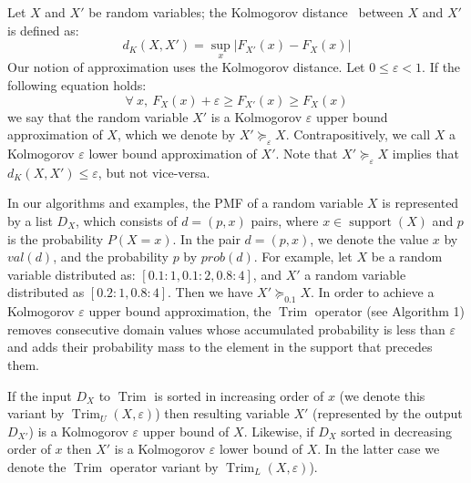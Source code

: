 \documentclass[review]{elsarticle}
\DeclareMathOperator{\support}{support}
\DeclareMathOperator{\Trim}{Trim}
\begin{document}
Let $X$ and $X'$ be random variables; 
the Kolmogorov distance~\cite{lilliefors1967kolmogorov} between $X$ and $X'$ is defined as:
\[
d_K(X,X') = \sup_{x} |F_{X'}(x)-F_X(x)|
\]
Our notion of approximation uses the Kolmogorov distance. Let $0\leq\varepsilon<1$. %
If the following equation holds:
\[
\forall ~ x, ~ F_X(x)+\varepsilon \geq F_{X'}(x) \geq F_X(x)
\]
we say that the random variable $X'$ is a Kolmogorov $\varepsilon$ upper bound approximation of $X$,
which we denote by $X' \succeq_\varepsilon X$. Contrapositively, we call $X$ a  Kolmogorov $\varepsilon$ lower
bound approximation of $X'$. Note that $X' \succeq_\varepsilon X$ implies that $d_K(X,X') \leq \varepsilon$,
but not vice-versa.

In our algorithms and examples,
the PMF of a random variable $X$ is represented by a list $D_X$, 
which consists of $d=(p, x)$ pairs, where $x\in \support(X)$
and $p$ is the probability $P(X=x)$. In the pair $d=(p, x)$, we denote the value $x$
by $val(d)$, and the probability $p$ by $prob(d)$.
For example, let $X$ be a random variable distributed as: $[0.1:1, 0.1:2, 0.8:4]$, and $X'$ a random variable distributed as $[0.2:1, 0.8:4]$. Then we have $X' \succeq_{0.1} X$. In order to achieve a Kolmogorov $\varepsilon$ upper bound approximation,
the $\Trim$ operator (see Algorithm 1) removes consecutive domain values whose accumulated probability is
less than $\varepsilon$ and adds 
their probability mass to the element in the support that precedes them.

If the input $D_X$ to $\Trim$ is sorted in increasing order of $x$ (we denote this variant by $\Trim_U(X, \varepsilon)$)
then resulting variable $X'$ (represented by the output $D_{X'}$) 
is a Kolmogorov $\varepsilon$ upper bound of $X$.
Likewise, if $D_X$ sorted in decreasing order of $x$
then $X'$ is a Kolmogorov $\varepsilon$ 
lower bound of $X$. In the latter case we denote the $\Trim$ operator variant by $\Trim_L(X, \varepsilon)$).

%
\end{document}
